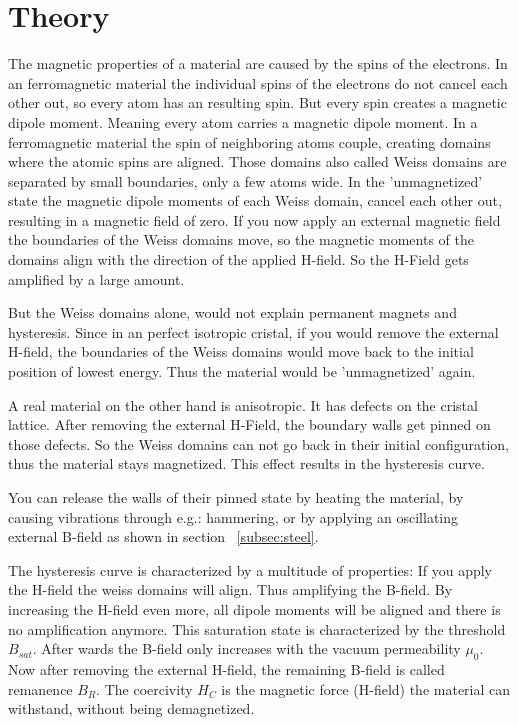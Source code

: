 \documentclass[a4paper,10pt,twocolumn]{article}
\begin{document}
    \section{Theory}
    
    The magnetic properties of a material are caused by the spins of the electrons.
    In an ferromagnetic material the individual spins of the electrons do not cancel each other out, so every atom has an
    resulting spin.
    But every spin creates a magnetic dipole moment.
    Meaning every atom carries a magnetic dipole moment.
    In a ferromagnetic material the spin of neighboring atoms couple,
    creating domains where the atomic spins are aligned. 
    Those domains also called Weiss domains are separated by small boundaries, only a few atoms wide.
    In the 'unmagnetized' state the magnetic dipole moments of each Weiss domain, cancel each other out, resulting in
    a magnetic field of zero.
    If you now apply an external magnetic field the boundaries of the Weiss domains move, so the magnetic moments of the
    domains align with the direction of the applied H-field.
    So the H-Field gets amplified by a large amount.
    
    But the Weiss domains alone, would not explain permanent magnets and hysteresis. 
    Since in an perfect isotropic cristal, if you would remove the external H-field, the boundaries of the Weiss domains
    would move back to the initial position of lowest energy. 
    Thus the material would be 'unmagnetized' again.
    
    A real material on the other hand is anisotropic.
    It has defects on the cristal lattice.
    After removing the external H-Field, the boundary walls get pinned on those defects.
    So the Weiss domains can not go back in their initial configuration, thus the material stays magnetized.
    This effect results in the hysteresis curve.
    
    You can release the walls of their pinned state by heating the material, by causing vibrations through e.g.: hammering,  
    or by applying an oscillating external B-field as shown in section ~\ref{subsec:steel}.
    
    The hysteresis curve is characterized by a multitude of properties:
    If you apply the H-field the weiss domains will align.
    Thus amplifying the B-field. 
    By increasing the H-field even more, all dipole moments will be aligned and there is no amplification anymore.
    This saturation state is characterized by the threshold $B_{sat}$.
    After wards the B-field only increases with the vacuum permeability $\mu_0$.
    Now after removing the external H-field, the remaining B-field is called remanence $B_{R}$.
    The coercivity $H_C$ is the magnetic force (H-field) the material can withstand, without being demagnetized.
    
\end{document}
